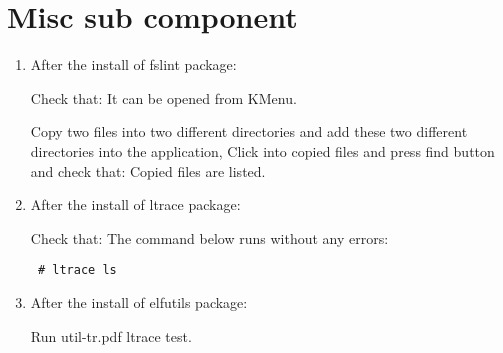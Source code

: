 \documentclass[a4paper,10pt]{article}
\begin{document}
\section{Misc sub component}
\begin{enumerate}
 \item After the install of fslint package:

Check that: It can be opened from KMenu.

Copy two files into two different directories and add these two different directories into the application, Click into copied files and press find button and check that: Copied files are listed.
 \item After the install of ltrace package:

Check that: The command below runs without any errors:
\begin{verbatim}
 # ltrace ls
\end{verbatim}
\item After the install of elfutils package:

Run util-tr.pdf ltrace test.
\end{enumerate}
\end{document}
